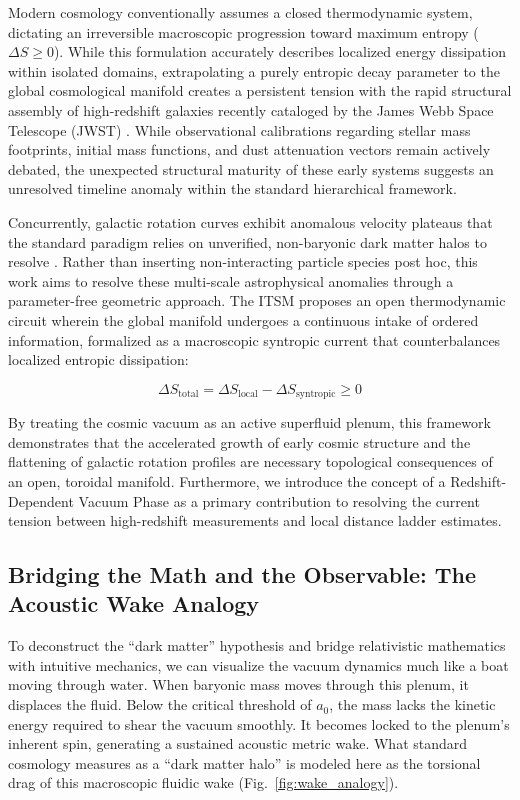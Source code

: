 \documentclass[aps,prd,10pt,twocolumn,superscriptaddress,nofootinbib]{revtex4-2}
\begin{document}
Modern cosmology conventionally assumes a closed thermodynamic system, dictating an irreversible macroscopic progression toward maximum entropy ($\Delta S \ge 0$). While this formulation accurately describes localized energy dissipation within isolated domains, extrapolating a purely entropic decay parameter to the global cosmological manifold creates a persistent tension with the rapid structural assembly of high-redshift galaxies recently cataloged by the James Webb Space Telescope (JWST) \cite{jwst_labbe, jwst_curtis_lake, jwst_carniani}. While observational calibrations regarding stellar mass footprints, initial mass functions, and dust attenuation vectors remain actively debated, the unexpected structural maturity of these early systems suggests an unresolved timeline anomaly within the standard hierarchical framework. 

Concurrently, galactic rotation curves exhibit anomalous velocity plateaus that the standard paradigm relies on unverified, non-baryonic dark matter halos to resolve \cite{rubin}. Rather than inserting non-interacting particle species post hoc, this work aims to resolve these multi-scale astrophysical anomalies through a parameter-free geometric approach. The ITSM proposes an open thermodynamic circuit wherein the global manifold undergoes a continuous intake of ordered information, formalized as a macroscopic syntropic current that counterbalances localized entropic dissipation:

\begin{equation}
\Delta S_{\text{total}} = \Delta S_{\text{local}} - \Delta S_{\text{syntropic}} \ge 0
\end{equation}

By treating the cosmic vacuum as an active superfluid plenum, this framework demonstrates that the accelerated growth of early cosmic structure and the flattening of galactic rotation profiles are necessary topological consequences of an open, toroidal manifold. Furthermore, we introduce the concept of a Redshift-Dependent Vacuum Phase as a primary contribution to resolving the current tension between high-redshift measurements and local distance ladder estimates.

\subsection{Bridging the Math and the Observable: The Acoustic Wake Analogy}
To deconstruct the ``dark matter'' hypothesis and bridge relativistic mathematics with intuitive mechanics, we can visualize the vacuum dynamics much like a boat moving through water. When baryonic mass moves through this plenum, it displaces the fluid. Below the critical threshold of $a_0$, the mass lacks the kinetic energy required to shear the vacuum smoothly. It becomes locked to the plenum's inherent spin, generating a sustained acoustic metric wake. What standard cosmology measures as a ``dark matter halo'' is modeled here as the torsional drag of this macroscopic fluidic wake (Fig.~\ref{fig:wake_analogy}).
\end{document}
